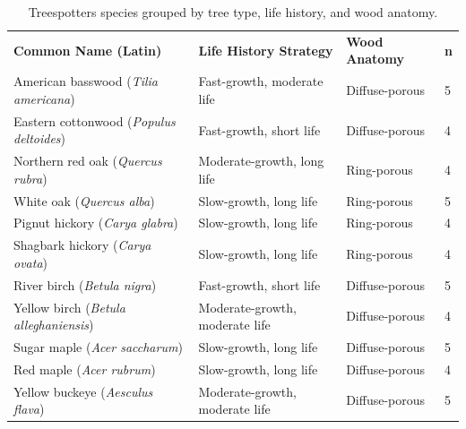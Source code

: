 \documentclass{article}
\begin{document}
\begin{table}[h]
\centering
\caption{Treespotters species grouped by tree type, life history, and wood anatomy.}
\label{tab:coringTreespottersSpecies}
\begin{tabular}{|>{\raggedright\arraybackslash}p{7cm}|p{5cm}|p{3cm}|p{1cm}|}
\hline
\multicolumn{4}{|c|}{\textbf{Deciduous Trees}} \\
\hline
\textbf{Common Name (Latin)} & \textbf{Life History Strategy} & \textbf{Wood Anatomy} & \textbf{n} \\
\hline
American basswood (\textit{Tilia americana}) & Fast-growth, moderate life & Diffuse-porous & 5\\
Eastern cottonwood (\textit{Populus deltoides}) & Fast-growth, short life & Diffuse-porous & 4\\
Northern red oak (\textit{Quercus rubra}) & Moderate-growth, long life & Ring-porous & 4\\
White oak (\textit{Quercus alba}) & Slow-growth, long life & Ring-porous & 5\\
Pignut hickory (\textit{Carya glabra}) & Slow-growth, long life & Ring-porous & 4\\
Shagbark hickory (\textit{Carya ovata}) & Slow-growth, long life & Ring-porous & 4\\
River birch (\textit{Betula nigra}) & Fast-growth, short life & Diffuse-porous & 5\\
Yellow birch (\textit{Betula alleghaniensis}) & Moderate-growth, moderate life & Diffuse-porous & 4\\
Sugar maple (\textit{Acer saccharum}) & Slow-growth, long life & Diffuse-porous & 5\\
Red maple (\textit{Acer rubrum}) & Slow-growth, long life & Diffuse-porous & 4\\
Yellow buckeye (\textit{Aesculus flava}) & Moderate-growth, moderate life & Diffuse-porous & 5\\
\hline
\end{tabular}
\end{table}
\end{document}
